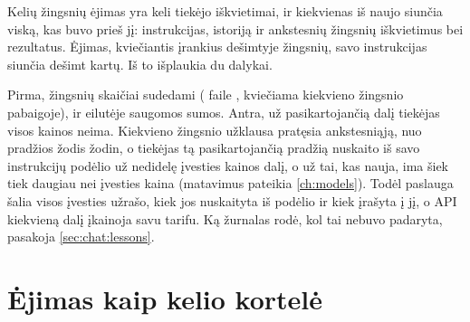 Kelių žingsnių ėjimas yra keli tiekėjo iškvietimai, ir kiekvienas iš naujo siunčia viską, kas
buvo prieš jį: instrukcijas, istoriją ir ankstesnių žingsnių iškvietimus bei rezultatus. Ėjimas,
kviečiantis įrankius dešimtyje žingsnių, savo instrukcijas siunčia dešimt kartų. Iš to išplaukia
du dalykai.

Pirma, žingsnių skaičiai sudedami ( faile , kviečiama kiekvieno
žingsnio pabaigoje), ir eilutėje saugomos sumos. Antra, už pasikartojančią dalį tiekėjas visos
kainos neima. Kiekvieno žingsnio užklausa pratęsia ankstesniąją, nuo pradžios žodis žodin, o
tiekėjas tą pasikartojančią pradžią nuskaito iš savo instrukcijų podėlio už nedidelę įvesties
kainos dalį, o už tai, kas nauja, ima šiek tiek daugiau nei įvesties kaina (matavimus pateikia
\cref{ch:models}). Todėl paslauga šalia visos įvesties užrašo, kiek jos nuskaityta iš podėlio ir
kiek įrašyta į jį, o API kiekvieną dalį įkainoja savu tarifu. Ką žurnalas rodė, kol tai nebuvo
padaryta, pasakoja \cref{sec:chat:lessons}.


\section{Ėjimas kaip kelio kortelė}\label{sec:chat:card}

